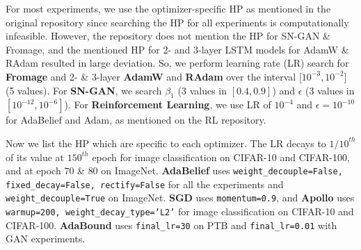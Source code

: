 For most experiments, we use the optimizer-specific HP as mentioned in the original repository since searching the HP for all experiments is computationally infeasible. However, the repository does not mention the HP for SN-GAN \& Fromage, and the mentioned HP for 2- and 3-layer LSTM models for AdamW \& RAdam resulted in large deviation. So, we perform learning rate (LR) search for \textbf{Fromage} and 2- \& 3-layer \textbf{AdamW} and \textbf{RAdam} over the interval [$10^{-3}, 10^{-2}$] (5 values). For \textbf{SN-GAN}, we search $\beta_1$ (3 values in $[0.4, 0.9]$) and $\epsilon$ (3 values in $[10^{-12}, 10^{-6}]$). For \textbf{Reinforcement Learning}, we use LR of $10^{-4}$ and $\epsilon = 10^{-10}$ for AdaBelief and Adam, as mentioned on the RL repository.

Now we list the HP which are specific to each optimizer. The LR decays to ${1/10}^{th}$ of its value at $150^{th}$ epoch for image classification on CIFAR-10 and CIFAR-100, and at epoch $70$ \& $80$ on ImageNet. \textbf{AdaBelief} uses \texttt{weight\_decouple=False, fixed\_decay=False, rectify=False} for all the experiments and \texttt{weight\_decouple=True} on ImageNet. \textbf{SGD} uses \texttt{momentum=0.9}, and \textbf{Apollo} uses \texttt{warmup=200, weight\_decay\_type='L2'} for image classification on CIFAR-10 and CIFAR-100. \textbf{AdaBound} uses \texttt{final\_lr=30} on PTB and \texttt{final\_lr=0.01} with GAN experiments.

    






